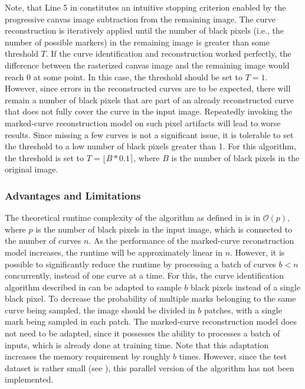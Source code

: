 Note, that Line 5 in  constitutes an intuitive stopping criterion enabled by the progressive canvas image subtraction from the remaining image. The curve reconstruction is iteratively applied until the number of black pixels (i.e., the number of possible markers) in the remaining image is greater than some threshold $T$. If the curve identification and reconstruction worked perfectly, the difference between the rasterized canvas image and the remaining image would reach 0 at some point. In this case, the threshold should be set to $T=1$. However, since errors in the reconstructed curves are to be expected, there will remain a number of black pixels that are part of an already reconstructed curve that does not fully cover the curve in the input image. Repeatedly invoking the marked-curve reconstruction model on such pixel artifacts will lead to worse results. Since missing a few curves is not a significant issue, it is tolerable to set the threshold to a low number of black pixels greater than 1. For this algorithm, the threshold is set to $T=\lfloor B*0.1 \rceil$, where $B$ is the number of black pixels in the original image.

\subsubsection{Advantages and Limitations}
\label{subsec:method.limitations}

The theoretical runtime complexity of the algorithm as defined in  is in $\mathcal{O}(p)$, where $p$ is the number of black pixels in the input image, which is connected to the number of curves $n$. As the performance of the marked-curve reconstruction model increases, the runtime will be approximately linear in $n$. However, it is possible to significantly reduce the runtime  by processing a batch of curves $b<n$ concurrently, instead of one curve at a time. For this, the curve identification algorithm described in  can be adapted to sample $b$ black pixels instead of a single black pixel. To decrease the probability of multiple marks belonging to the same curve being sampled, the image should be divided in $b$ patches, with a single mark being sampled in each patch. The marked-curve reconstruction model does not need to be adapted, since it possesses the ability to processes a batch of inputs, which is already done at training time. Note that this adaptation increases the memory requirement by roughly $b$ times. However, since the test dataset is rather small (see ), this parallel version of the algorithm has not been implemented.

